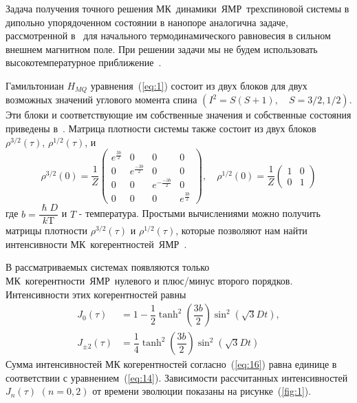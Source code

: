 \documentclass[utf8]{jetp}
\begin{document}
Задача получения точного решения МК~динамики~ЯМР~трехспиновой системы в дипольно упорядоченном состоянии в нанопоре аналогична задаче, рассмотренной в~\cite{Doronin_2019} для начального термодинамического равновесия в сильном внешнем магнитном поле.
При решении задачи мы не будем  использовать высокотемпературное приближение~\cite{Goldman_1970}.

Гамильтониан $H_{MQ}$ уравнения~(\ref{eq:1}) состоит из двух блоков для двух возможных значений углового момента спина $(I^2 = S(S+1), \quad S=3/2,1/2)$.
Эти блоки и соответствующие им собственные значения и собственные состояния приведены в~\cite{Doronin_2019}.
Матрица плотности системы также состоит из двух блоков $\rho^{3/2}(\tau)$, $\rho^{1/2}(\tau)$, и
%
\begin{equation}
  \label{eq:15}
  \rho^{3/2}(0) = \dfrac 1 Z
  \begin{pmatrix}
    e^{\frac{3b}{2}} & 0 & 0 & 0
    \\
    0 & e^{\frac{-3b}{2}} & 0 & 0
    \\
    0 & 0 & e^{-\frac{-3b}{2}} & 0
    \\
    0 & 0 & 0 & e^{\frac{3b}{2}}
  \end{pmatrix},
  \quad
  \rho^{1/2}(0) = \dfrac 1 Z
  \begin{pmatrix}
    	1 & 0
    \\
    0 & 1
  \end{pmatrix}
\end{equation}
%
где $b = \dfrac{\hslash D}{k\mathrm{T}}$ и $T$ - температура.
Простыми вычислениями можно получить матрицы плотности $\rho^{3/2}(\tau)$ и $\rho^{1/2}(\tau)$,
которые позволяют нам найти интенсивности МК~когерентностей~ЯМР~.

В рассматриваемых системах появляются только МК~когерентности~ЯМР~нулевого и плюс/минус второго порядков.
Интенсивности этих когерентностей равны
%
\begin{equation}
  \begin{split}
    \label{eq:16}
    J_0(\tau) & = 1
    - \dfrac 1 2 \tanh^2\left( \dfrac{3b}{2} \right)
      \sin^2 \left( \sqrt{3} Dt \right),
    \\
    J_{\pm2}(\tau) & = \dfrac{1}{4}
      \tanh^2 \left( \dfrac{3b}{2} \right)
      \sin^2 \left( \sqrt{3} Dt \right)
  \end{split}
\end{equation}
%
Сумма интенсивностей МК когерентностей согласно~(\ref{eq:16}) равна единице в соответствии с уравнением~(\ref{eq:14}).
Зависимости рассчитанных интенсивностей $J_{n}(\tau)$ $(n=0,2)$ от времени эволюции показаны на рисунке~(\ref{fig:1}).
\end{document}
